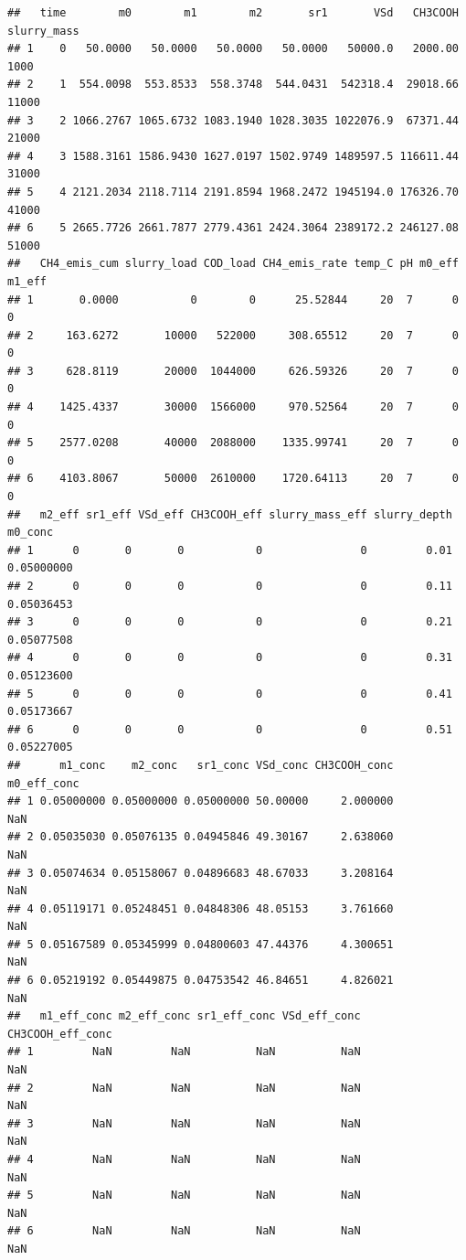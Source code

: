 \documentclass[
]{article}
\begin{document}
\begin{verbatim}
##   time        m0        m1        m2       sr1       VSd   CH3COOH slurry_mass
## 1    0   50.0000   50.0000   50.0000   50.0000   50000.0   2000.00        1000
## 2    1  554.0098  553.8533  558.3748  544.0431  542318.4  29018.66       11000
## 3    2 1066.2767 1065.6732 1083.1940 1028.3035 1022076.9  67371.44       21000
## 4    3 1588.3161 1586.9430 1627.0197 1502.9749 1489597.5 116611.44       31000
## 5    4 2121.2034 2118.7114 2191.8594 1968.2472 1945194.0 176326.70       41000
## 6    5 2665.7726 2661.7877 2779.4361 2424.3064 2389172.2 246127.08       51000
##   CH4_emis_cum slurry_load COD_load CH4_emis_rate temp_C pH m0_eff m1_eff
## 1       0.0000           0        0      25.52844     20  7      0      0
## 2     163.6272       10000   522000     308.65512     20  7      0      0
## 3     628.8119       20000  1044000     626.59326     20  7      0      0
## 4    1425.4337       30000  1566000     970.52564     20  7      0      0
## 5    2577.0208       40000  2088000    1335.99741     20  7      0      0
## 6    4103.8067       50000  2610000    1720.64113     20  7      0      0
##   m2_eff sr1_eff VSd_eff CH3COOH_eff slurry_mass_eff slurry_depth    m0_conc
## 1      0       0       0           0               0         0.01 0.05000000
## 2      0       0       0           0               0         0.11 0.05036453
## 3      0       0       0           0               0         0.21 0.05077508
## 4      0       0       0           0               0         0.31 0.05123600
## 5      0       0       0           0               0         0.41 0.05173667
## 6      0       0       0           0               0         0.51 0.05227005
##      m1_conc    m2_conc   sr1_conc VSd_conc CH3COOH_conc m0_eff_conc
## 1 0.05000000 0.05000000 0.05000000 50.00000     2.000000         NaN
## 2 0.05035030 0.05076135 0.04945846 49.30167     2.638060         NaN
## 3 0.05074634 0.05158067 0.04896683 48.67033     3.208164         NaN
## 4 0.05119171 0.05248451 0.04848306 48.05153     3.761660         NaN
## 5 0.05167589 0.05345999 0.04800603 47.44376     4.300651         NaN
## 6 0.05219192 0.05449875 0.04753542 46.84651     4.826021         NaN
##   m1_eff_conc m2_eff_conc sr1_eff_conc VSd_eff_conc CH3COOH_eff_conc
## 1         NaN         NaN          NaN          NaN              NaN
## 2         NaN         NaN          NaN          NaN              NaN
## 3         NaN         NaN          NaN          NaN              NaN
## 4         NaN         NaN          NaN          NaN              NaN
## 5         NaN         NaN          NaN          NaN              NaN
## 6         NaN         NaN          NaN          NaN              NaN
\end{verbatim}
\end{document}
